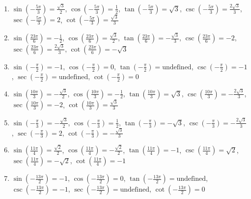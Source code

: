 \begin{enumerate}
    \item $\sin\left(-\frac{5\pi}{3}\right) = \frac{\sqrt{3}}{2}$, 
        $\cos\left(-\frac{5\pi}{3}\right) = \frac{1}{2}$, 
        $\tan\left(-\frac{5\pi}{3}\right) = \sqrt{3}$, 
        $\csc\left(-\frac{5\pi}{3}\right) = \frac{2\sqrt{3}}{3}$, 
        $\sec\left(-\frac{5\pi}{3}\right) = 2$, 
        $\cot\left(-\frac{5\pi}{3}\right) = \frac{\sqrt{3}}{3}$
        
    \item $\sin\left(\frac{23\pi}{6}\right) = -\frac{1}{2}$, 
        $\cos\left(\frac{23\pi}{6}\right) = \frac{\sqrt{3}}{2}$, 
        $\tan\left(\frac{23\pi}{6}\right) = -\frac{\sqrt{3}}{3}$, 
        $\csc\left(\frac{23\pi}{6}\right) = -2$, 
        $\sec\left(\frac{23\pi}{6}\right) = \frac{2\sqrt{3}}{3}$, 
        $\cot\left(\frac{23\pi}{6}\right) = -\sqrt{3}$
        
    \item $\sin\left(-\frac{\pi}{2}\right) = -1$, 
        $\cos\left(-\frac{\pi}{2}\right) = 0$, 
        $\tan\left(-\frac{\pi}{2}\right) = \text{undefined}$, 
        $\csc\left(-\frac{\pi}{2}\right) = -1$, 
        $\sec\left(-\frac{\pi}{2}\right) = \text{undefined}$, 
        $\cot\left(-\frac{\pi}{2}\right) = 0$
        
    \item $\sin\left(\frac{10\pi}{3}\right) = -\frac{\sqrt{3}}{2}$, 
        $\cos\left(\frac{10\pi}{3}\right) = -\frac{1}{2}$, 
        $\tan\left(\frac{10\pi}{3}\right) = \sqrt{3}$, 
        $\csc\left(\frac{10\pi}{3}\right) = -\frac{2\sqrt{3}}{3}$, 
        $\sec\left(\frac{10\pi}{3}\right) = -2$, 
        $\cot\left(\frac{10\pi}{3}\right) = \frac{\sqrt{3}}{3}$
        
    \item $\sin\left(-\frac{\pi}{3}\right) = -\frac{\sqrt{3}}{2}$, 
        $\cos\left(-\frac{\pi}{3}\right) = \frac{1}{2}$, 
        $\tan\left(-\frac{\pi}{3}\right) = -\sqrt{3}$, 
        $\csc\left(-\frac{\pi}{3}\right) = -\frac{2\sqrt{3}}{3}$, 
        $\sec\left(-\frac{\pi}{3}\right) = 2$, 
        $\cot\left(-\frac{\pi}{3}\right) = -\frac{\sqrt{3}}{3}$
        
    \item $\sin\left(\frac{11\pi}{4}\right) = \frac{\sqrt{2}}{2}$, 
        $\cos\left(\frac{11\pi}{4}\right) = -\frac{\sqrt{2}}{2}$, 
        $\tan\left(\frac{11\pi}{4}\right) = -1$, 
        $\csc\left(\frac{11\pi}{4}\right) = \sqrt{2}$, 
        $\sec\left(\frac{11\pi}{4}\right) = -\sqrt{2}$, 
        $\cot\left(\frac{11\pi}{4}\right) = -1$
        
    \item $\sin\left(-\frac{13\pi}{2}\right) = -1$, 
        $\cos\left(-\frac{13\pi}{2}\right) = 0$, 
        $\tan\left(-\frac{13\pi}{2}\right) = \text{undefined}$, 
        $\csc\left(-\frac{13\pi}{2}\right) = -1$, 
        $\sec\left(-\frac{13\pi}{2}\right) = \text{undefined}$, 
        $\cot\left(-\frac{13\pi}{2}\right) = 0$
    
    
\end{enumerate}